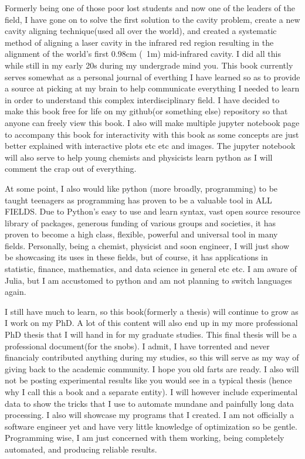 \documentclass[11pt,a4paper]{book}
\begin{document}
	Formerly being one of those poor lost students and now one of the leaders of the field, I have gone on to solve the first solution to the cavity problem, create a new cavity aligning technique(used all over the world), and created a systematic method of aligning a laser cavity in the infrared red region resulting in the alignment of the world's first 0.98cm (~1m) mid-infrared cavity. I did all this while still in my early 20s during my undergrade mind you. This book currently serves somewhat as a personal journal of everthing I have learned so as to provide a source at picking at my brain to help communicate everything I needed to learn in order to understand this complex interdisciplinary field. I have decided to make this book free for life on my github(or something else) repository so that anyone can freely view this book. I also will make multiple jupyter notebook page to accompany this book for interactivity with this book as some concepts are just better explained with interactive plots etc etc and images. The jupyter notebook will also serve to help young chemists and physicists learn python as I will comment the crap out of everything.
	
	At some point, I also would like python (more broadly, programming) to be taught teenagers as programming has proven to be a valuable tool in ALL FIELDS. Due to Python's easy to use and learn syntax, vast open source resource library of packages,  generous funding of various groups and societies, it has proven to become a high class, flexible, powerful and universal tool in many fields. Personally, being a chemist, physicist and soon engineer, I will just show be showcasing its uses in these fields, but of course, it has applications in statistic, finance, mathematics, and data science in general etc etc. I am aware of Julia, but I am accustomed to python and am not planning to switch languages again.
	
	I still have much to learn, so this book(formerly a thesis) will continue to grow as I work on my PhD. A lot of this content will also end up in my more professional PhD thesis that I will hand in for my graduate studies. This final thesis will be a professional document(for the snobs). I admit, I have torrented and never financialy contributed anything during my studies, so this will serve as my way of giving back to the academic community. I hope you old farts are ready. I also will not be posting experimental results like you would see in a typical thesis (hence why I call this a book and a separate entity). I will however include experimental data to show the tricks that I use to automate mundane and painfully long data processing. I also will showcase my programs that I created. I am not officially a software engineer yet and have very little knowledge of optimization so be gentle. Programming wise, I am just concerned with them working, being completely automated, and producing reliable results.
	
\end{document}

